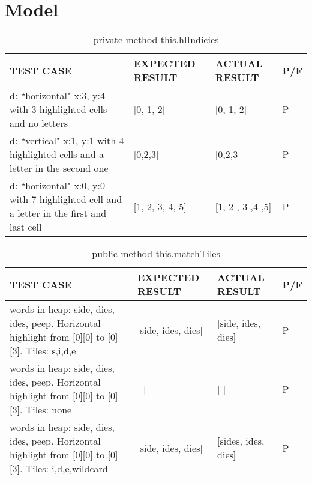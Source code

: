 \documentclass[11pt, oneside]{report}
\begin{document}
\section{Model}

\begin{table}[H]
\caption{private method this.hlIndicies}
\begin{center}
\begin{tabular}{|p{}|p{}|p{}|p{}|}

\hline
\textbf{TEST CASE} & \textbf{EXPECTED RESULT} & \textbf{ACTUAL RESULT} & P/F \\
\hline
d: ``horizontal" x:3, y:4 with 3 highlighted cells and no letters & [0, 1, 2] & [0, 1, 2] & P \\
\hline
d: ``vertical" x:1, y:1 with 4 highlighted cells and a letter in the second one & [0,2,3] & [0,2,3] & P \\
\hline
d: ``horizontal" x:0, y:0 with 7 highlighted cell and a letter in the first and last cell & [1, 2, 3, 4, 5] & [1, 2 , 3 ,4 ,5] & P \\
\hline
\end{tabular}
\end{center}
\label{default}
\end{table}%

\begin{table}[H]
\caption{public method this.matchTiles}
\begin{center}
\begin{tabular}{|p{}|p{}|p{}|p{}|}

\hline
\textbf{TEST CASE} & \textbf{EXPECTED RESULT} & \textbf{ACTUAL RESULT} & P/F \\
\hline
words in heap: side, dies, ides, peep. Horizontal highlight from [0][0] to [0][3]. Tiles: s,i,d,e
& [side, ides, dies] & [side, ides, dies] & P \\
\hline
words in heap: side, dies, ides, peep. Horizontal highlight from [0][0] to [0][3]. Tiles: none & [ ] & [ ] & P \\
\hline
words in heap: side, dies, ides, peep. Horizontal highlight from [0][0] to [0][3]. Tiles: i,d,e,wildcard & [side, ides, dies] & [sides, ides, dies] & P \\
\hline


\hline
\end{tabular}
\end{center}
\label{default}
\end{table}%
\end{document}
